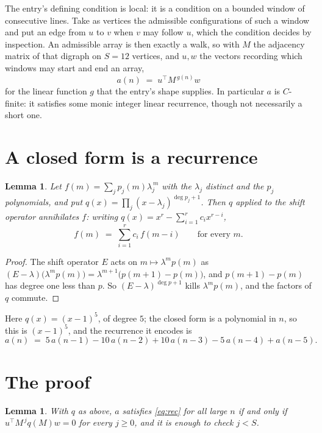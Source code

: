 \documentclass[11pt,a4paper]{article}
\theoremstyle{plain}
\newtheorem{lemma}[theorem]{Lemma}
\theoremstyle{definition}
\begin{document}
The entry's defining condition is local: it is a condition on a bounded window of consecutive lines. Take as vertices the
admissible configurations of such a window and put an edge from $u$ to $v$ when $v$ may
follow $u$, which the condition decides by inspection. An admissible array is then exactly a
walk, so with $M$ the adjacency matrix of that digraph on $S=12$ vertices, and $u,w$ the
vectors recording which windows may start and end an array,
\[
a(n)\;=\;u^{\!\top}M^{\,g(n)}w
\]
for the linear function $g$ that the entry's shape supplies. In particular $a$ is
$C$-finite: it satisfies some monic integer linear recurrence, though not necessarily a short
one.

\section{A closed form is a recurrence}

\begin{lemma}\label{lem:ann}
Let $f(m)=\sum_{j}p_j(m)\lambda_j^{\,m}$ with the $\lambda_j$ distinct and the $p_j$
polynomials, and put $q(x)=\prod_j(x-\lambda_j)^{\deg p_j+1}$. Then $q$ applied to the shift
operator annihilates $f$: writing $q(x)=x^{r}-\sum_{i=1}^{r}c_ix^{r-i}$,
\[
f(m)\;=\;\sum_{i=1}^{r}c_i\,f(m-i)\qquad\text{for every }m.
\]
\end{lemma}

\begin{proof}
The shift operator $E$ acts on $m\mapsto\lambda^{m}p(m)$ as
$(E-\lambda)\bigl(\lambda^{m}p(m)\bigr)=\lambda^{m+1}\bigl(p(m+1)-p(m)\bigr)$, and
$p(m+1)-p(m)$ has degree one less than $p$. So $(E-\lambda)^{\deg p+1}$ kills
$\lambda^{m}p(m)$, and the factors of $q$ commute.
\end{proof}

Here $q(x)=(x-1)^{5}$, of degree $5$; the closed form is a polynomial in $n$, so this is $(x-1)^{5}$, and the recurrence it encodes is
\begin{equation}\label{eq:rec}
a(n)\;=\;5\,a(n-1) - 10\,a(n-2) + 10\,a(n-3) - 5\,a(n-4) + a(n-5).
\end{equation}

\section{The proof}

\begin{lemma}\label{lem:crit}
With $q$ as above, $a$ satisfies \eqref{eq:rec} for all large $n$ if and only if
$u^{\!\top}M^{\,j}q(M)w=0$ for every $j\ge0$, and it is enough to check $j<S$.
\end{lemma}
\end{document}
